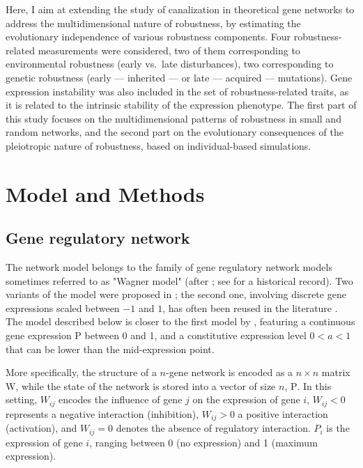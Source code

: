 \documentclass[10pt,a4paper]{article}
\newcommand{\W}{\bm{\mathrm W}}
\newcommand{\Pp}{\bm{\mathrm P}}
\begin{document}
Here, I aim at extending the study of canalization in theoretical gene networks to address the multidimensional nature of robustness, by estimating the evolutionary independence of various robustness components. Four robustness-related measurements were considered, two of them corresponding to environmental robustness (early vs.\ late disturbances), two corresponding to genetic robustness (early --- inherited --- or late --- acquired --- mutations). Gene expression instability was also included in the set of robustness-related traits, as it is related to the intrinsic stability of the expression phenotype. The first part of this study focuses on the multidimensional patterns of robustness in small and random networks, and the second part on the evolutionary consequences of the pleiotropic nature of robustness, based on individual-based simulations. 

\section{Model and Methods}

\subsection{Gene regulatory network}

The network model belongs to the family of gene regulatory network models sometimes referred to as "Wagner model" (after \citealp{Wag94,Wag96}; see \citealp{FP15} for a historical record). Two variants of the model were proposed in \citet{Wag94}; the second one, involving discrete gene expressions scaled between $-1$ and $1$, has often been reused in the literature \citep{Wag96,SB02,CMW07}. The model described below is closer to the first model by \citet{Wag94}, featuring a continuous gene expression $\Pp$ between 0 and 1, and a constitutive expression level $0 < a < 1$ that can be lower than the mid-expression point. 

More specifically, the structure of a $n$-gene network is encoded as a $n\times n$ matrix $\W$, while the state of the network is stored into a vector of size $n$, $\Pp$. In this setting, $W_{ij}$ encodes the influence of gene $j$ on the expression of gene $i$, $W_{ij} < 0$ represents a negative interaction (inhibition), $W_{ij} > 0$ a positive interaction (activation), and $W_{ij} = 0$ denotes the absence of regulatory interaction. $P_i$ is the expression of gene $i$, ranging between 0 (no expression) and 1 (maximum expression). 
\end{document}
